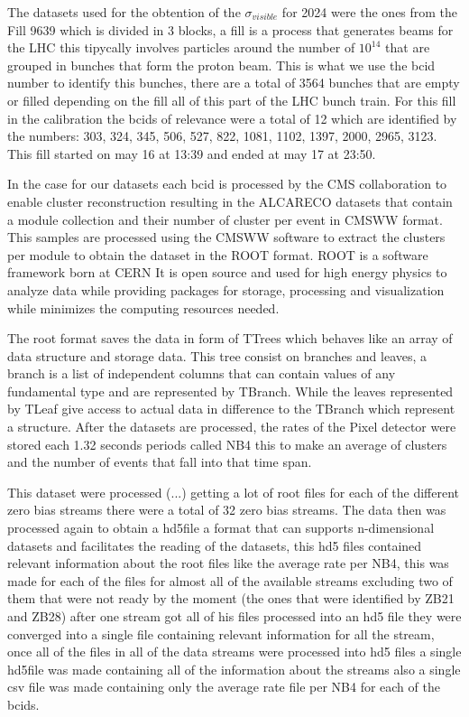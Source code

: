 The datasets used for the obtention of the $\sigma_{visible}$ for 2024 were the ones from the Fill 9639 which is divided in 3 blocks, a fill is a process that generates beams for the LHC this tipycally involves particles around the number of $10^{14}$ that are grouped in bunches that form the proton beam. This is what we use the bcid number to identify this bunches, there are a total of 3564 bunches that are empty or filled depending on the fill all of this part of the LHC bunch train. For this fill in the calibration the bcids of relevance were a total of 12 which are identified by the numbers: 303, 324, 345, 506, 527, 822, 1081, 1102, 1397, 2000, 2965, 3123. This fill started on may 16 at 13:39 and ended at may 17 at 23:50.

In the case for our datasets each bcid is processed by the CMS collaboration to enable cluster reconstruction resulting in the ALCARECO datasets that contain a module collection and their number of cluster per event in CMSWW format. This samples are processed using the CMSWW software to extract the clusters per module to obtain the dataset in the ROOT format. ROOT is a software framework born at CERN It is open source and used for high energy physics to analyze data while providing packages for storage, processing and visualization while minimizes the computing resources needed. 

The root format saves the data in form of TTrees which behaves like an array of data structure and storage data. This tree consist on branches and leaves, a branch is a list of independent columns that can contain values of any fundamental type and are represented by TBranch. While the leaves represented by TLeaf give access to actual data in difference to the TBranch which represent a structure. After the datasets are processed, the rates of the Pixel detector were stored each 1.32 seconds periods called NB4 this to make an average of clusters and the number of events that fall into that time span. 

This dataset were processed (...) getting a lot of root files for each of the different zero bias streams there were a total of 32 zero bias streams. The data then was processed again to obtain a hd5file a format that can supports n-dimensional datasets and facilitates the reading of the datasets, this hd5 files contained relevant information about the root files like the average rate per NB4, this was made for each of the files for almost all of the available streams excluding two of them that were not ready by the moment (the ones that were identified by ZB21 and ZB28) after one stream got all of his files processed into an hd5 file they were converged into a single file containing relevant information for all the stream, once all of the files in all of the data streams were processed into hd5 files a single hd5file was made containing all of the information about the streams also a single csv file was made containing only the average rate file per NB4 for each of the bcids.  
 
